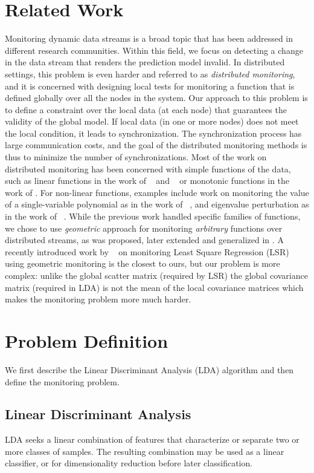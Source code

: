 \documentclass{vldb}
\begin{document}
\section{Related Work}
Monitoring dynamic data streams is a broad topic that has been addressed in different research communities. Within this field, we focus on detecting a change in the data stream that renders the prediction model invalid. 
In distributed settings, this problem is even harder and referred to as {\em distributed monitoring}, and it is concerned with designing local tests for monitoring a function that is defined globally over all the nodes in the system.
Our approach to this problem is to define a constraint over the local data (at each node) that guarantees the validity of the global model. If local data (in one or more nodes) does not meet the local condition, it leads to synchronization. The synchronization process has large communication costs, and the goal of the distributed monitoring methods is thus to minimize the number of synchronizations. Most of the work on distributed monitoring has been concerned with simple functions of the data, such as linear functions in the work of ~\cite{keralapura2006communication} and ~\cite{kashyap2008efficient} or monotonic functions in the work of \cite{michel2005klee}.
For non-linear functions, examples include work on monitoring the value
of a single-variable polynomial as in the work of ~\cite{shah2008handling},
and eigenvalue perturbation as in the work of ~\cite{huang2007communication}.
While the previous work handled specific families of functions, we chose to use \textit{geometric} approach for monitoring \textit{arbitrary} functions over distributed streams, as was proposed, later extended and generalized in \cite{sharfman2007geometric, keren2014geometric, keren2012shape}. A recently introduced work by ~\cite{gabel2015monitoring} on monitoring Least Square Regression (LSR) using geometric monitoring is the closest to ours, but our problem is more complex: unlike the global scatter matrix (required by LSR) the global covariance matrix (required in LDA) is not the mean of the local covariance matrices which makes the monitoring problem more much harder.

\section{Problem Definition}
We first describe the Linear Discriminant Analysis (LDA) algorithm and then define the monitoring problem. 

\subsection{Linear Discriminant Analysis}%
LDA seeks a linear combination of features that characterize or separate two or more classes of samples.
The resulting combination may be used as a linear classifier, or for dimensionality reduction before later classification.
\end{document}
